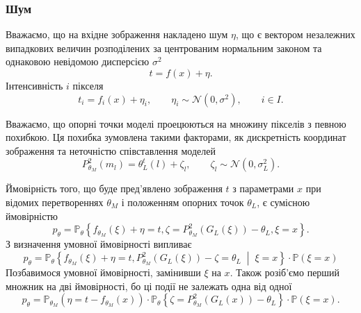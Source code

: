 \subsubsection{Шум}

Вважаємо,
що на вхідне зображення накладено шум $\eta$,
що є вектором незалежних випадкових величин
розподілених за центрованим нормальним законом
та однаковою невідомою дисперсією $\sigma^2$
\begin{equation*}
  t = f\left( x \right) + \eta.
\end{equation*}
Інтенсивність $i$ пікселя
\begin{equation*}
  t_i = f_i\left( x \right) + \eta_i,\qquad
  \eta_i \sim \mathcal{N}\left( 0, \sigma^2 \right), \qquad
  i \in I.
\end{equation*}

Вважаємо, що опорні точки моделі проецюються на множину пікселів
з певною похибкою.
Ця похибка зумовлена такими факторами,
як дискретність координат зображення та неточністю співставлення моделей
\begin{equation*}
  P^2_{\theta_M}\left( m_l \right) = \theta_L^t\left( l \right) + \zeta_l,
  \qquad \zeta_l \sim \mathcal{N}\left( 0, \sigma_L^2 \right).
\end{equation*}

Ймовірність того,
що буде пред'явлено зображення $t$ з параметрами $x$
при відомих перетвореннях $\theta_M$
і положенням опорних точок $\theta_L$, є сумісною ймовірністю
\begin{equation*}
  p_{\theta}
  = \mathbb{P}_{\theta}\left\{
    f_{\theta_M}\left( \xi \right) + \eta = t,
    \zeta = P^2_{\theta_M}\left( G_L\left( \xi \right) \right) - \theta_L,
    \xi = x
  \right\}.
\end{equation*}
З визначення умовної ймовірності випливає
\begin{equation*}
  p_{\theta}
  = \mathbb{P}_{\theta}\left\{
      f_{\theta_M}\left( \xi \right) + \eta = t,
      P^2_{\theta_M}\left( G_L\left( \xi \right) \right) - \zeta = \theta_L
      \;\middle|\; \xi = x \right\}
    \cdot \mathbb{P}\left( \xi = x \right)
\end{equation*}
Позбавимося умовної ймовірності, замінивши $\xi$ на $x$.
Також розіб'ємо перший множник на дві ймовірності,
бо ці події не залежать одна від одної
\begin{equation*}
  p_{\theta}
  = \mathbb{P}_{\theta_M}\left( \eta = t - f_{\theta_M}\left( x \right) \right)
    \cdot \mathbb{P}_{\theta}\left\{
      \zeta = P^2_{\theta_M}\left( G_L\left( x \right) \right) - \theta_L
    \right\}
    \cdot \mathbb{P}\left( \xi = x \right).
\end{equation*}

